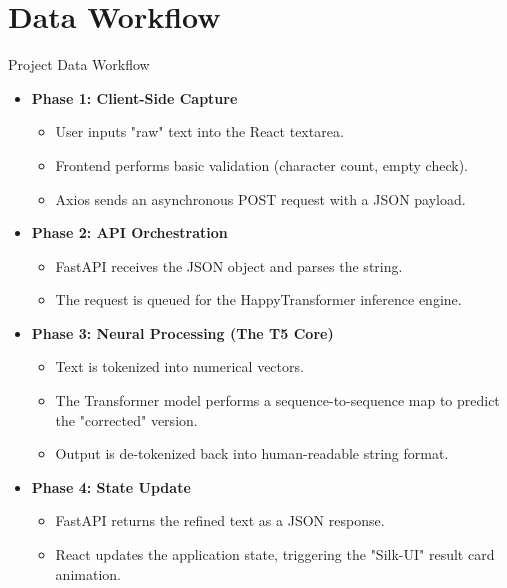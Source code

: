\documentclass{beamer}
\begin{document}
\section{Data Workflow}
\begin{frame}{Project Data Workflow}
    \begin{itemize}
        \item \textbf{Phase 1: Client-Side Capture}
        \begin{itemize}
            \item User inputs "raw" text into the React textarea.
            \item Frontend performs basic validation (character count, empty check).
            \item Axios sends an asynchronous POST request with a JSON payload.
        \end{itemize}
        
        \item \textbf{Phase 2: API Orchestration}
        \begin{itemize}
            \item FastAPI receives the JSON object and parses the string.
            \item The request is queued for the HappyTransformer inference engine.
        \end{itemize}
        
        \item \textbf{Phase 3: Neural Processing (The T5 Core)}
        \begin{itemize}
            \item Text is tokenized into numerical vectors.
            \item The Transformer model performs a sequence-to-sequence map to predict the "corrected" version.
            \item Output is de-tokenized back into human-readable string format.
        \end{itemize}
        
        \item \textbf{Phase 4: State Update}
        \begin{itemize}
            \item FastAPI returns the refined text as a JSON response.
            \item React updates the application state, triggering the "Silk-UI" result card animation.
        \end{itemize}
    \end{itemize}
\end{frame}
\end{document}
